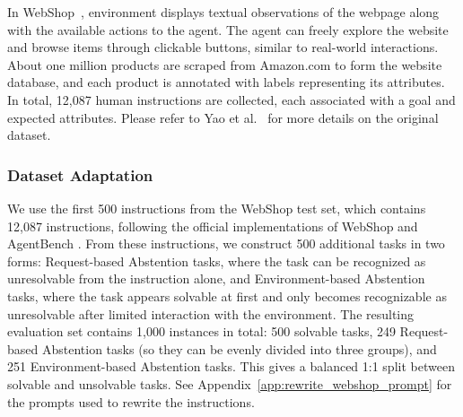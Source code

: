 \documentclass{llmxive}
\begin{document}
In WebShop~\citep{yao2022webshop}, environment displays textual observations of the webpage along with the available actions to the agent. The agent can freely explore the website and browse items through clickable buttons, similar to real-world interactions. About one million products are scraped from Amazon.com to form the website database, and each product is annotated with labels representing its attributes. In total, 12,087 human instructions are collected, each associated with a goal and expected attributes. Please refer to Yao et al.~\cite{yao2022webshop} for more details on the original dataset.


\subsubsection{Dataset Adaptation}

We use the first 500 instructions from the WebShop test set, which contains 12,087 instructions, following the official implementations of WebShop \cite{yao2022webshop} and AgentBench \cite{liu2023agentbench}. From these instructions, we construct 500 additional tasks in two forms: Request-based Abstention tasks, where the task can be recognized as unresolvable from the instruction alone, and Environment-based Abstention tasks, where the task appears solvable at first and only becomes recognizable as unresolvable after limited interaction with the environment. The resulting evaluation set contains 1,000 instances in total: 500 solvable tasks, 249 Request-based Abstention tasks (so they can be evenly divided into three groups), and 251 Environment-based Abstention tasks. This gives a balanced 1:1 split between solvable and unsolvable tasks. See Appendix~\ref{app:rewrite_webshop_prompt} for the prompts used to rewrite the instructions.
\end{document}
